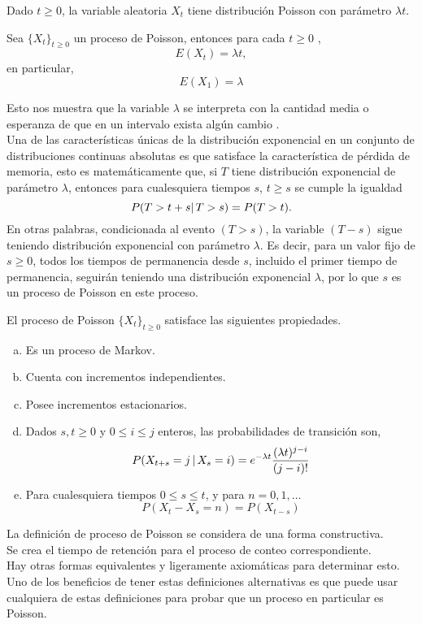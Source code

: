     \begin{Prop}
        Dado $t\geq 0$, la variable aleatoria $X_t$ tiene distribución Poisson con parámetro $\lambda t$.
    \end{Prop}
   \begin{Cor}
   Sea $\{X_t\}_{t\geq 0}$ un proceso de Poisson, entonces para cada $t\geq 0$ , $$E(X_t)=\lambda t,$$ en particular, 
   $$E(X_1)=\lambda$$
   
   \end{Cor}
   Esto nos muestra que la variable $\lambda$ se interpreta con la cantidad media o esperanza de que en un intervalo exista algún cambio .\\
  Una de las características únicas de la distribución exponencial en un conjunto de distribuciones continuas absolutas es que satisface la característica de pérdida de memoria, esto es matemáticamente que, si $T$ tiene distribución exponencial de parámetro $\lambda$, entonces para cualesquiera tiempos $s$, $t\geq s$ se cumple la igualdad $$P(T>t+s|\thinspace T>s)=P(T>t).$$
    En otras palabras, condicionada al evento $(T>s)$, la variable $(T-s)$ sigue teniendo distribución exponencial con parámetro $\lambda$.
    Es decir, para un valor fijo de $ s \geq0$, todos los tiempos de permanencia desde $s $, incluido el primer tiempo de permanencia, seguirán teniendo una distribución exponencial $ \lambda $, por lo que $s$ es un proceso de Poisson en este proceso.
    \begin{Prop} 
        El proceso de Poisson $\{X_t\}_{t\geq 0}$ satisface las siguientes
        propiedades.
        \label{prop_procPoisson_constructiva}
        \begin{enumerate}[a)]
            \item Es un proceso de Markov.
            \item Cuenta con incrementos independientes.
            \item Posee incrementos estacionarios.
            \item Dados $s,t \geq 0$ y $0\leq i\leq j$ enteros, las probabilidades de transición son, $$P(X_{t+s}=j\thinspace|\thinspace X_s=i)= e^{-\lambda t}\frac{(\lambda t)^{j-i}}{(j-i)!}$$
            \item Para cualesquiera tiempos $0\leq s\leq t$, y para $n=0,1,\ldots$
            $$P(X_t-X_s=n)=P(X_{t-s})$$
        \end{enumerate}
    \end{Prop}
    La definición de proceso de Poisson se considera de una forma constructiva.\\
    Se crea el tiempo de retención para el proceso de conteo correspondiente. \\
    Hay otras formas equivalentes y ligeramente axiomáticas para determinar esto.
    Uno de los beneficios de tener estas definiciones alternativas es que puede usar cualquiera de estas definiciones para probar que un proceso en particular es Poisson. \\ \
